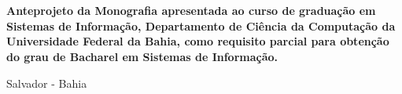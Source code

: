 

\begin{titlepage}
 \vfill
 \begin{center}
   {\large \uppercase{ \bf{ \meunome\ } } } \\[7cm]
   {\Huge \uppercase{ \bf{ \meutitulo\ } } }\\[1cm]
   \vfill
   \hspace{.45\textwidth} %
   \begin{minipage}{.5\textwidth}
     \begin{espacosimples}
       \bf{
	Anteprojeto da Monografia apresentada ao curso de graduação em Sistemas de Informação,
	Departamento de Ciência da Computação da Universidade Federal da
	Bahia, como requisito parcial para obtenção do grau de Bacharel em Sistemas de Informação. \\
       }
     \end{espacosimples}
     \begin{espacosimples}
       \meuorientador
       \newline
       \meucoorientador
     \end{espacosimples}
   \end{minipage}
   \vfill
   Salvador - Bahia \\
   \meuano
 \end{center}
\end{titlepage}

